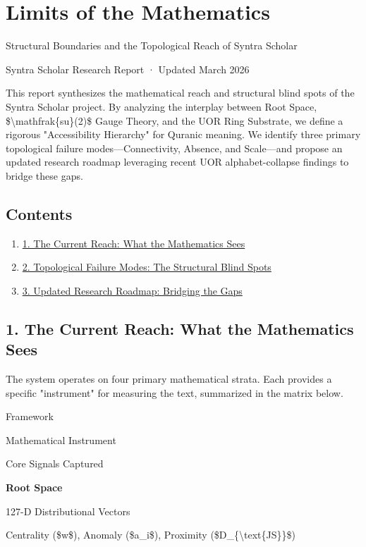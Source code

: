 \documentclass[12pt,a4paper]{article}
\providecommand{\tightlist}{\setlength{\itemsep}{0pt}\setlength{\parskip}{0pt}}
\begin{document}
\section{Limits of the Mathematics}\label{limits-of-the-mathematics}

Structural Boundaries and the Topological Reach of Syntra Scholar

Syntra Scholar Research Report · Updated March 2026

This report synthesizes the mathematical reach and structural blind
spots of the Syntra Scholar project. By analyzing the interplay between
Root Space, \$\textbackslash mathfrak\{su\}(2)\$ Gauge Theory, and the
UOR Ring Substrate, we define a rigorous "Accessibility Hierarchy" for
Quranic meaning. We identify three primary topological failure
modes---Connectivity, Absence, and Scale---and propose an updated
research roadmap leveraging recent UOR alphabet-collapse findings to
bridge these gaps.

\subsection{Contents}\label{contents}

\begin{enumerate}
\tightlist
\item
  \hyperref[reach]{1. The Current Reach: What the Mathematics Sees}
\item
  \hyperref[blind-spots]{2. Topological Failure Modes: The Structural
  Blind Spots}
\item
  \hyperref[roadmap]{3. Updated Research Roadmap: Bridging the Gaps}
\end{enumerate}

\subsection{1. The Current Reach: What the Mathematics
Sees}\label{reach}

The system operates on four primary mathematical strata. Each provides a
specific "instrument" for measuring the text, summarized in the matrix
below.

Framework

Mathematical Instrument

Core Signals Captured

\textbf{Root Space}

127-D Distributional Vectors

Centrality (\$w\$), Anomaly (\$a\_i\$), Proximity
(\$D\_\{\textbackslash text\{JS\}\}\$)
\end{document}
